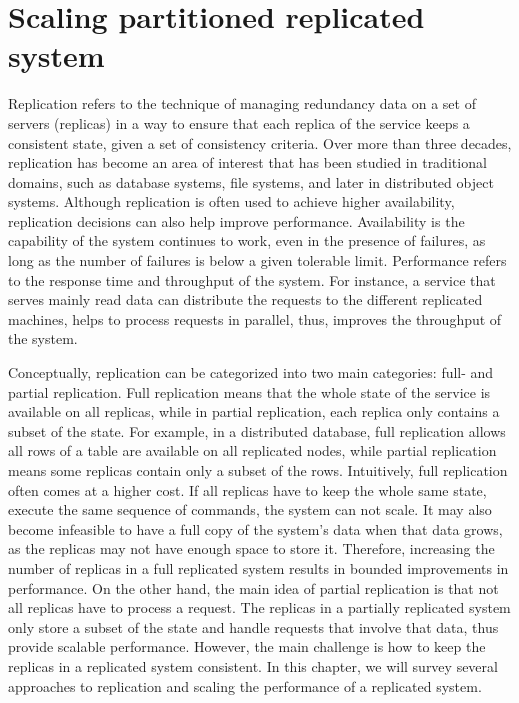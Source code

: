 \chapter[Scaling partitioned replicated system]{Scaling partitioned replicated system}

Replication refers to the technique of managing redundancy data on a set of
servers (replicas) in a way to ensure that each replica of the service keeps a
consistent state, given a set of consistency criteria. Over more than three
decades, replication has become an area of interest that has been studied in
traditional domains, such as database systems, file systems, and later in
distributed object systems. Although replication is often used to achieve higher
availability, replication decisions can also help improve performance.
Availability is the capability of the system continues to work, even in the
presence of failures, as long as the number of failures is below a given
tolerable limit. Performance refers to the response time and throughput of the 
system. For instance, a service that serves mainly read data can distribute the
requests to the different replicated machines, helps to process requests in
parallel, thus, improves the throughput of the system. 

Conceptually, replication can be categorized into two main categories: full- and
partial replication. Full replication means that the whole state of the service
is available on all replicas, while in partial replication, each replica only
contains a subset of the state. For example, in a distributed database, full
replication allows all rows of a table are available on all replicated nodes,
while partial replication means some replicas contain only a subset of the rows.
Intuitively, full replication often comes at a higher cost. If all replicas have
to keep the whole same state, execute the same sequence of commands, the system
can not scale. It may also become infeasible to have a full copy of the system's
data when that data grows, as the replicas may not have enough space to store
it. Therefore, increasing the number of replicas in a full replicated system
results in bounded improvements in performance. On the other hand, the main idea
of partial replication is that not all replicas have to process a request. The
replicas in a partially replicated system only store a subset of the state and
handle requests that involve that data, thus provide scalable performance.
However, the main challenge is how to keep the replicas in a replicated system
consistent. In this chapter, we will survey several approaches to replication
and scaling the performance of a replicated system.

